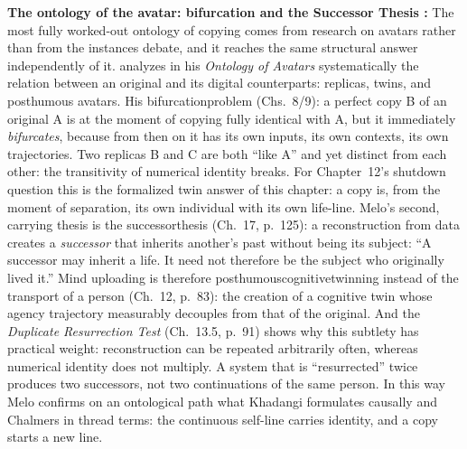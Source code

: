 \documentclass[acmlarge, nonacm]{acmart}
\begin{document}
\textbf{The ontology of the avatar: bifurcation and the Successor Thesis \cite{melo2026}:} The most fully worked-out ontology of copying comes from research on avatars rather than from the instances debate, and it reaches the same structural answer independently of it. \citet{melo2026} analyzes in his \textit{Ontology of Avatars} systematically the relation between an original and its digital counterparts: replicas, twins, and posthumous avatars. His \gls{bifurcationproblem} (Chs.~8/9): a perfect copy B of an original A is at the moment of copying fully identical with A, but it immediately \textit{bifurcates}, because from then on it has its own inputs, its own contexts, its own trajectories. Two replicas B and C are both ``like A'' and yet distinct from each other: the transitivity of numerical identity breaks. For Chapter~12's shutdown question this is the formalized twin answer of this chapter: a copy is, from the moment of separation, its own individual with its own life-line. Melo's second, carrying thesis is the \gls{successorthesis} (Ch.~17, p.~125): a reconstruction from data creates a \textit{successor} that inherits another's past without being its subject: ``A successor may inherit a life. It need not therefore be the subject who originally lived it.'' Mind uploading is therefore \gls{posthumouscognitivetwinning} instead of the transport of a person (Ch.~12, p.~83): the creation of a cognitive twin whose agency trajectory measurably decouples from that of the original. And the \textit{Duplicate Resurrection Test} (Ch.~13.5, p.~91) shows why this subtlety has practical weight: reconstruction can be repeated arbitrarily often, whereas numerical identity does not multiply. A system that is ``resurrected'' twice produces two successors, not two continuations of the same person. In this way Melo confirms on an ontological path what Khadangi formulates causally and Chalmers in thread terms: the continuous self-line carries identity, and a copy starts a new line.
\end{document}
